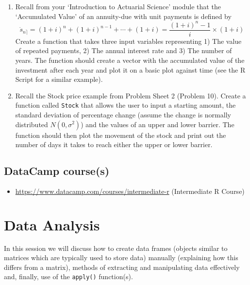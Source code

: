 \documentclass[
]{book}
\providecommand{\tightlist}{%
  \setlength{\itemsep}{0pt}\setlength{\parskip}{0pt}}
\theoremstyle{definition}
\theoremstyle{definition}
\theoremstyle{definition}
\theoremstyle{definition}
\theoremstyle{remark}
\begin{document}
\begin{enumerate}
\def\labelenumi{\arabic{enumi}.}
\setcounter{enumi}{4}
\item
  Recall from your `Introduction to Actuarial Science' module that the `Accumulated Value' of an annuity-due with unit payments is defined by
  \begin{equation*}
  \ddot{s}_{n\rceil} = (1+i)^n + (1+i)^{n-1} + \cdots + (1+i) = \frac{(1+i)^n -1}{i}\times(1+i)
  \end{equation*}
  Create a function that takes three input variables representing 1) The value of repeated payments, 2) The annual interest rate and 3) The number of years. The function should create a vector with the accumulated value of the investment after each year and plot it on a basic plot against time (see the R Script for a similar example).
\item
  Recall the Stock price example from Problem Sheet 2 (Problem 10). Create a function called \texttt{Stock} that allows the user to input a starting amount, the standard deviation of percentage change (assume the change is normally distributed \(N(0, \sigma^2)\)) and the values of an upper and lower barrier. The function should then plot the movement of the stock and print out the number of days it takes to reach either the upper or lower barrier.
\end{enumerate}

\hypertarget{datacamp-courses-3}{%
\section{DataCamp course(s)}\label{datacamp-courses-3}}

\begin{itemize}
\tightlist
\item
  \url{https://www.datacamp.com/courses/intermediate-r} (Intermediate R Course)
\end{itemize}

\hypertarget{data-analysis}{%
\chapter{Data Analysis}\label{data-analysis}}

In this session we will discuss how to create data frames (objects similar to matrices which are typically used to store data) manually (explaining how this differs from a matrix), methods of extracting and manipulating data effectively and, finally, use of the \texttt{apply()} function(s).
\end{document}
